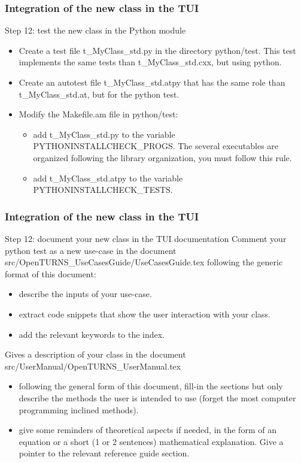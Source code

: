 \documentclass[8pt]{beamer}
\begin{document}
\begin{frame}
  \frametitle{Integration of the new class in the TUI}
  \begin{block}{Step 12: test the new class in the Python module}
    \begin{itemize}
    \item Create a test file t\_MyClass\_std.py in the directory python/test. This test implements the same tests than t\_MyClass\_std.cxx, but using python.
    \item Create an autotest file t\_MyClass\_std.atpy that has the same role than t\_MyClass\_std.at, but for the python test.
    \item Modify the Makefile.am file in python/test:
      \begin{itemize}
      \item add t\_MyClass\_std.py to the variable PYTHONINSTALLCHECK\_PROGS. The several executables are organized following the library organization, you must follow this rule.
      \item add t\_MyClass\_std.atpy to the variable PYTHONINSTALLCHECK\_TESTS.
      \end{itemize}
    \end{itemize}
  \end{block}
\end{frame}
\begin{frame}
  \frametitle{Integration of the new class in the TUI}
  \begin{block}{Step 12: document your new class in the TUI documentation}
    Comment your python test as a new use-case in the document\\ src/OpenTURNS\_UseCasesGuide/UseCasesGuide.tex following the generic format of this document:
    \begin{itemize}
    \item describe the inputs of your use-case.
    \item extract code snippets that show the user interaction with your class.
    \item add the relevant keywords to the index.
    \end{itemize}
    Gives a description of your class in the document src/UserManual/OpenTURNS\_UserManual.tex
    \begin{itemize}
    \item following the general form of this document, fill-in the sections but only describe the methods the user is intended to use (forget the most computer programming inclined methods).
    \item give some reminders of theoretical aspects if needed, in the form of an equation or a short (1 or 2 sentences) mathematical explanation. Give a pointer to the relevant reference guide section.
    \end{itemize}
  \end{block}
\end{frame}
\end{document}
